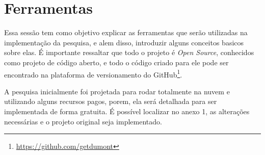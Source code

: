 \section{Ferramentas}
Essa sessão tem como objetivo explicar as ferramentas que serão utilizadas na implementação da pesquisa, e alem disso, introduzir alguns conceitos basicos sobre elas. É importante ressaltar que todo o projeto é \textit{Open Source}, conhecidos como projeto de código aberto, e todo o código criado para ele pode ser encontrado na plataforma de versionamento do GitHub\footnote{\url{https://github.com/getdumont}}.

A pesquisa inicialmente foi projetada para rodar totalmente na nuvem e utilizando alguns recursos pagos, porem, ela será detalhada para ser implementada de forma gratuita. É possível localizar no anexo 1, as alterações necessárias e o projeto original seja implementado.


